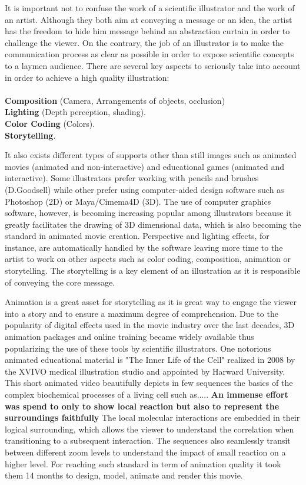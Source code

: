 It is important not to confuse the work of a scientific illustrator and the work of an artist.
Although they both aim at conveying a message or an idea, the artist has the freedom to hide him message behind an abstraction curtain in order to challenge the viewer.
On the contrary, the job of an illustrator is to make the communication process as clear as possible in order to expose scientific concepts to a laymen audience.
There are several key aspects to seriously take into account in order to achieve a high quality illustration:
\\
\\ \textbf{Composition} (Camera, Arrangements of objects, occlusion)
\\ \textbf{Lighting} (Depth perception, shading).
\\ \textbf{Color Coding} (Colors).
\\ \textbf{Storytelling}.

It also exists different types of supports other than still images such as animated movies (animated and non-interactive) and educational games (animated and interactive).
Some illustrators prefer working with pencils and brushes (D.Goodsell) while other prefer using computer-aided design software such as Photoshop (2D) or Maya/Cimema4D (3D).
The use of computer graphics software, however, is becoming increasing popular among illustrators because it greatly facilitates the drawing of 3D dimensional data, which is also becoming the standard in animated movie creation.
Perspective and lighting effects, for instance, are automatically handled by the software leaving more time to the artist to work on other aspects such as color coding, composition, animation or storytelling.
The storytelling is a key element of an illustration as it is responsible of conveying the core message.

Animation is a great asset for storytelling as it is great way to engage the viewer into a story and to ensure a maximum degree of comprehension.
Due to the popularity of digital effects used in the movie industry over the last decades, 3D animation packages and online training became widely available thus popularizing the use of these tools by scientific illustrators.
One notorious animated educational material is "The Inner Life of the Cell" realized in 2008 by the XVIVO medical illustration studio and appointed by Harward University.
This short animated video beautifully depicts in few sequences the basics of the complex biochemical processes of a living cell such as.....
\textbf{An immense effort was spend to only to show local reaction but also to represent the surroundings faithfully}
The local molecular interactions are embedded in their logical surrounding, which allows the viewer to understand the correlation when transitioning to a subsequent interaction.
The sequences also seamlessly transit between different zoom levels to understand the impact of small reaction on a higher level.
For reaching such standard in term of animation quality it took them 14 months to design, model, animate and render this movie.

